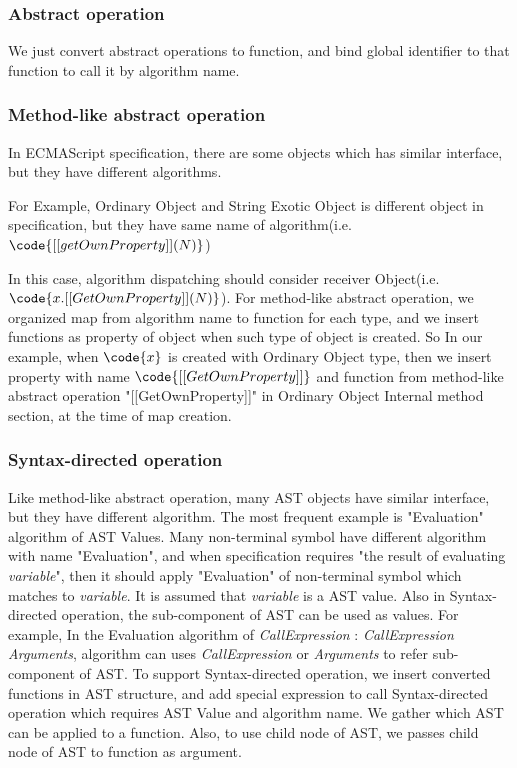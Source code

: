 \subsubsection{Abstract operation}

We just convert abstract operations to function, and bind global identifier to that function to call it by algorithm name.

\subsubsection{Method-like abstract operation}

In ECMAScript specification, there are some objects which has similar interface, but they have different algorithms. 

For Example, Ordinary Object and String Exotic Object is different object in specification, but they have same name of algorithm(i.e. \( \code{[[getOwnProperty]](N)} \))

In this case, algorithm dispatching should consider receiver Object(i.e. \( \code{x.[[GetOwnProperty]](N)} \)).
For method-like abstract operation, we organized map from algorithm name to function for each type,
 and we insert functions as property of object when such type of object is created. So In our example, when  \( \code{x} \) is created with Ordinary Object type,
 then we insert property with name \( \code{[[GetOwnProperty]]} \) and function from method-like abstract operation "[[GetOwnProperty]]" in Ordinary Object Internal method section, at the time of map creation.

 \subsubsection{Syntax-directed operation}
 
 Like method-like abstract operation, many AST objects have similar interface, but they have different algorithm.
The most frequent example is "Evaluation" algorithm of AST Values. Many non-terminal symbol have different algorithm with name "Evaluation", and
when specification requires "the result of evaluating \textit{variable}", then it should apply "Evaluation" of non-terminal symbol which matches to \textit{variable}.
It is assumed that \textit{variable} is a AST value. Also in Syntax-directed operation, the sub-component of AST can be used as values. For example, In the
Evaluation algorithm of \textit{CallExpression} : \textit{CallExpression} \textit{Arguments}, algorithm can uses \textit{CallExpression} or \textit{Arguments} to refer sub-component of AST.
 To support Syntax-directed operation, we insert converted functions in AST structure, and add special expression to call Syntax-directed operation which requires AST Value and algorithm name.
We gather which AST can be applied to a function. Also, to use child node of AST, we passes child node of AST to function as argument.

